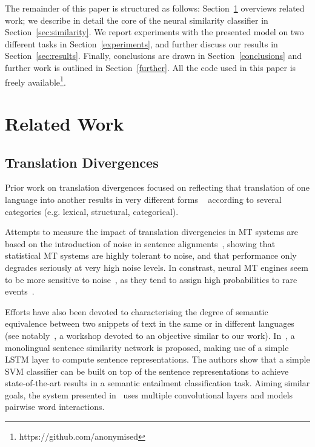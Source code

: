 \documentclass[11pt,a4paper]{article}
\begin{document}

The remainder of this paper is structured as follows:
Section~\ref{related} overviews related work;
we describe in detail the core of the neural similarity classifier in Section~\ref{sec:similarity}. 
We report experiments with the presented model on two different tasks
in Section~\ref{experiments}, and further discuss our results in Section~\ref{sec:results}. 
Finally, conclusions are drawn in Section~\ref{conclusions} and further work is outlined in Section~\ref{further}.
All the code used in this paper is freely available\footnote{https://github.com/anonymised}.

\section{Related Work}
\label{related}

\subsection{Translation Divergences}

Prior work on translation divergences focused on reflecting that translation of one language into another results in very different forms ~\cite{J94-4004} according to several categories (e.g. lexical, structural, categorical). 

Attempts to measure the impact of translation divergencies in MT
systems are based on the introduction of noise in sentence
alignments~\cite{goute2012}, showing that statistical MT systems are
highly tolerant to noise, and that performance only degrades seriously
at very high noise levels. In constrast, neural MT engines seem to be
more sensitive to noise~\cite{chen2016adaptation}, as they tend to assign high probabilities to rare events~\cite{Hassan2018AchievingHP}.

Efforts have also been devoted to characterising the degree of
semantic equivalence between two snippets of text in the same or in
different languages (see notably~\cite{conf/semeval/AgirreBCDGMRW16}, a workshop devoted to an objective similar to our work). In~\cite{Mueller:2016:SRA:3016100.3016291}, a monolingual sentence similarity network is proposed, making use of a simple LSTM layer to compute sentence representations. The authors show that a simple SVM classifier can be built on top of the sentence representations to achieve state-of-the-art results in a semantic entailment classification task. Aiming similar goals, the system presented in~\cite{N16-1108} uses multiple convolutional layers and models pairwise word interactions. %
\end{document}
